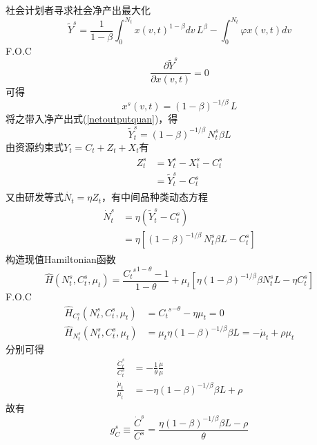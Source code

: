 \documentclass[cn,normal,11pt,black]{elegantnote}
\begin{document}
社会计划者寻求社会净产出最大化
\begin{equation}\label{netoutputquan}
    \widetilde Y^s = \frac{1}{1-\beta} \int_0^{N_t} x(v,t)^{1-\beta} dv \, L^\beta -
                        \int_0^{N_t} \varphi x(v,t)dv 
\end{equation}
F.O.C
\begin{equation}
    \frac{\partial \tilde Y^s}{\partial x(v,t)} = 0
\end{equation}
可得
\begin{equation}
    x^s(v,t) = (1-\beta)^{-1/\beta} \, L
\end{equation}
将之带入净产出式(\ref{netoutputquan})，得
\begin{equation}
    \tilde Y^s_t = (1-\beta)^{-1/\beta} \, N^s_t \beta L  
\end{equation}
由资源约束式$Y_t = C_t + Z_t + X_t$有
\begin{align}
\begin{aligned}
    Z_t^s & = Y_t^s - X_t^s - C_t^s \\
         & = \tilde Y_t^s - C_t^s
\end{aligned}
\end{align}
又由研发等式$\dot{N_t} = \eta Z_t$，有中间品种类动态方程
\begin{align}
\begin{aligned}
    \dot{N}^s_t & = \eta(\tilde Y^s_t - C^s_t) \\
               & = \eta[ (1-\beta)^{-1/\beta} \, N^s_t \beta L - C^s_t]
\end{aligned}
\end{align}
构造现值Hamiltonian函数
\begin{equation}
    \hat{H}(N_t^s, C_t^s, \mu_t) = \frac{{{C_t}^s}^{1-\theta}-1}{1-\theta} + 
                              \mu_t \left[\eta(1-\beta)^{-1 / \beta} \beta N_t^s L-\eta C_t^s\right]
\end{equation}
F.O.C
\begin{align}
    \hat{H}_{C^s_t}(N^s_t, C^s_t, \mu_t) & = {{C_t}^s}^{-\theta}-\eta \mu_t = 0 \\ 
    \hat{H}_{N^s_t}(N^s_t, C^s_t, \mu_t) & = \mu_t \eta(1-\beta)^{-1 / \beta} \beta L = -\dot{\mu}_t + \rho \mu_t
\end{align}
分别可得
\begin{align}
    \frac{\dot{C}^s_t}{C^s_t} & = -\frac{1}{\theta} \frac{\dot{\mu}}{\mu} \\ 
    \frac{\dot{\mu}_t}{\mu_t} & = - \eta (1-\beta)^{-1/\beta} \beta L + \rho
\end{align}
故有
\begin{equation}
    g_C^s \equiv \frac{\dot{C}^s}{C^s} = \frac{\eta (1-\beta)^{-1/\beta} \beta L - \rho}{\theta}
\end{equation}
\end{document}
